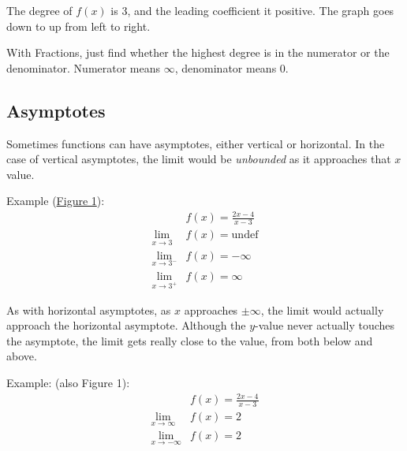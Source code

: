 \documentclass[12pt]{article}
\begin{document}
The degree of $f(x)$ is $3$, and the leading coefficient it positive. The graph goes down to up from left to right.

With Fractions, just find whether the highest degree is in the numerator or the denominator. Numerator means $\infty$, denominator means $0$.

\subsection{Asymptotes}
Sometimes functions can have asymptotes, either vertical or horizontal. In the case of vertical asymptotes, the limit would be \textit{unbounded} as it approaches that $x$ value.

\noindent Example (\hyperref[fig:limasymptote]{Figure 1}):
\begin{align*}
	& f(x) = \frac{2x-4}{x-3} \\
	\lim_{x \to 3}   & f(x) = \text{undef}     \\
	\lim_{x \to 3^-} & f(x) = -\infty          \\
	\lim_{x \to 3^+} & f(x) = \infty
\end{align*}

As with horizontal asymptotes, as $x$ approaches $\pm \infty$, the limit would actually approach the horizontal asymptote. Although the $y$-value never actually touches the asymptote, the limit gets really close to the value, from both below and above.

\noindent Example: (also Figure 1):
\begin{align*}
	& f(x) = \frac{2x-4}{x-3} \\
	\lim_{x \to \infty}  & f(x) = 2                \\
	\lim_{x \to -\infty} & f(x) = 2
\end{align*}
\end{document}
